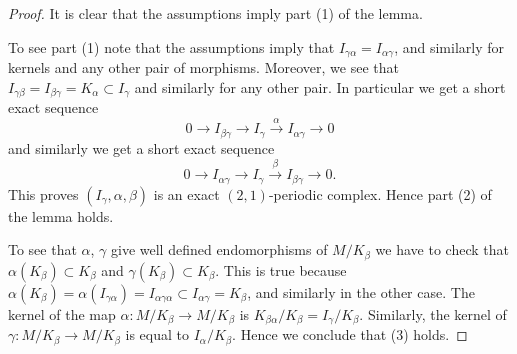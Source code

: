 \begin{proof}

It is clear that the assumptions imply part (1) of the lemma.

\medskip\noindent
To see part (1) note that the assumptions imply that
$I_{\gamma\alpha} = I_{\alpha\gamma}$, and similarly for kernels
and any other pair of morphisms.
Moreover, we see that
$I_{\gamma\beta} =I_{\beta\gamma} = K_\alpha \subset I_\gamma$ and
similarly for any other pair. In particular we get a short exact sequence
$$
0 \to I_{\beta\gamma} \to I_\gamma \xrightarrow{\alpha} I_{\alpha\gamma} \to 0
$$
and similarly we get a short exact sequence
$$
0 \to I_{\alpha\gamma} \to I_\gamma \xrightarrow{\beta} I_{\beta\gamma} \to 0.
$$
This proves $(I_\gamma, \alpha, \beta)$ is an exact $(2, 1)$-periodic
complex. Hence part (2) of the lemma holds.

\medskip\noindent
To see that $\alpha$, $\gamma$ give well defined endomorphisms
of $M/K_\beta$ we have to check that $\alpha(K_\beta) \subset K_\beta$
and $\gamma(K_\beta) \subset K_\beta$. This is true because
$\alpha(K_\beta) = \alpha(I_{\gamma\alpha}) = I_{\alpha\gamma\alpha}
\subset I_{\alpha\gamma} = K_\beta$, and similarly in the other case.
The kernel of the map $\alpha : M/K_\beta \to M/K_\beta$ is
$K_{\beta\alpha}/K_\beta = I_\gamma/K_\beta$. Similarly,
the kernel of $\gamma : M/K_\beta \to M/K_\beta$ is equal to
$I_\alpha/K_\beta$. Hence we conclude that (3) holds.


\end{proof}
